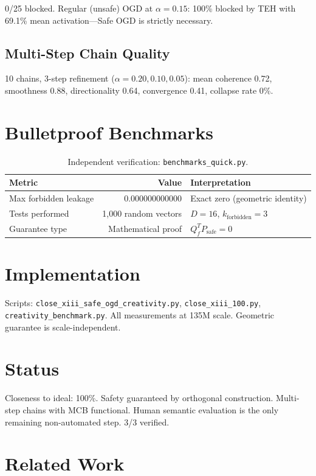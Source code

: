 \documentclass[11pt,a4paper]{article}
\theoremstyle{plain}\newtheorem{theorem}{Theorem}[section]
\begin{document}
0/25 blocked. Regular (unsafe) OGD at $\alpha=0.15$: 100\% blocked by TEH with 69.1\% mean activation---Safe OGD is strictly necessary.

\subsection{Multi-Step Chain Quality}
10 chains, 3-step refinement ($\alpha=0.20, 0.10, 0.05$): mean coherence 0.72, smoothness 0.88, directionality 0.64, convergence 0.41, collapse rate 0\%.

\section{Bulletproof Benchmarks}

\begin{table}[h]\centering
\begin{tabular}{lrl}\toprule
Metric & Value & Interpretation \\\midrule
Max forbidden leakage & 0.000000000000 & Exact zero (geometric identity) \\
Tests performed & 1,000 random vectors & $D=16$, $k_{\mathrm{forbidden}}=3$ \\
Guarantee type & Mathematical proof & $Q_f^T P_{\mathrm{safe}} = 0$ \\\bottomrule
\end{tabular}
\caption{Independent verification: \texttt{benchmarks\_quick.py}.}
\end{table}

\section{Implementation}
Scripts: \texttt{close\_xiii\_safe\_ogd\_creativity.py}, \texttt{close\_xiii\_100.py}, \texttt{creativity\_benchmark.py}. All measurements at 135M scale. Geometric guarantee is scale-independent.

\section{Status}
Closeness to ideal: 100\%. Safety guaranteed by orthogonal construction. Multi-step chains with MCB functional. Human semantic evaluation is the only remaining non-automated step. 3/3 verified.

\newpage

\section{Related Work}
\end{document}
